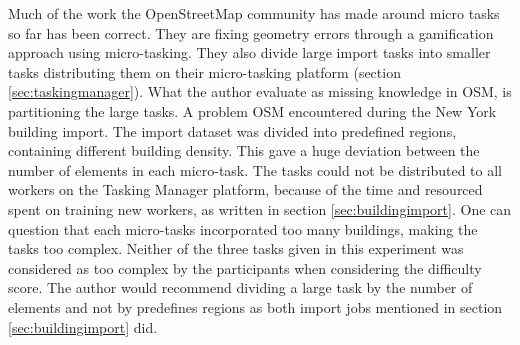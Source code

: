 Much of the work the OpenStreetMap community has made around micro tasks so far has been correct. They are fixing geometry errors through a gamification approach using micro-tasking. They also divide large import tasks into smaller tasks distributing them on their micro-tasking platform (section \ref{sec:taskingmanager}). What the author evaluate as missing knowledge in OSM, is partitioning the large tasks. A problem OSM encountered during the New York building import. The import dataset was divided into predefined regions, containing different building density. This gave a huge deviation between the number of elements in each micro-task. The tasks could not be distributed to all workers on the Tasking Manager platform, because of the time and resourced spent on training new workers, as written in section \ref{sec:buildingimport}. One can question that each micro-tasks incorporated too many buildings, making the tasks too complex. Neither of the three tasks given in this experiment was considered as too complex by the participants when considering the difficulty score. The author would recommend dividing a large task by the number of elements and not by predefines regions as both import jobs mentioned in section \ref{sec:buildingimport} did.




